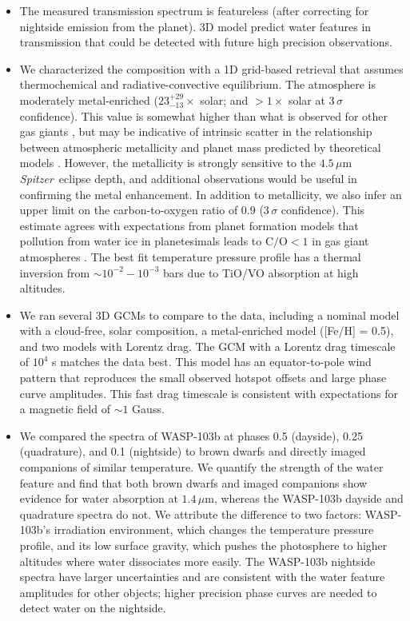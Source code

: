 \documentclass[twocolumn, trackchanges]{aastex61}
\newcommand{\project}[1]{\textsl{#1}}
\newcommand{\Spitzer}{\project{Spitzer}}
\begin{document}
\begin{itemize}
\item{The measured transmission spectrum is featureless (after correcting for nightside emission from the planet). 3D model predict water features in transmission that could be detected with future high precision observations.}
	\item{We characterized the composition with a 1D grid-based retrieval that assumes thermochemical and radiative-convective equilibrium. The atmosphere is moderately metal-enriched ($23^{+29}_{-13}\times$ solar; and $>1\times$ solar at $3\,\sigma$ confidence). This value is somewhat higher than what is observed for other gas giants \citep[e.g.][]{wong04, kreidberg14b}, but may be indicative of intrinsic scatter in the relationship between atmospheric metallicity and planet mass predicted by theoretical models \citep{fortney13, mordasini16}. However, the metallicity is strongly sensitive to the $4.5\,\mu$m \Spitzer\ eclipse depth, and additional observations would be useful in confirming the metal enhancement.  In addition to metallicity, we also infer an upper limit on the carbon-to-oxygen ratio of 0.9 ($3\,\sigma$ confidence). This estimate agrees with expectations from planet formation models that pollution from water ice in planetesimals leads to $\mathrm{C/O} < 1$ in gas giant atmospheres \citep{mordasini16, espinoza17}. The best fit temperature pressure profile has a thermal inversion from $\sim10^{-2} - 10^{-3}$ bars due to TiO/VO absorption at high altitudes.} 
	\item{We ran several 3D GCMs to compare to the data, including a nominal model with a cloud-free, solar composition, a metal-enriched model ([Fe/H] = 0.5), and two models with Lorentz drag. The GCM with a Lorentz drag timescale of $10^4$ s matches the data best. This model has an equator-to-pole wind pattern that reproduces the small observed hotspot offsets and large phase curve amplitudes. This fast drag timescale is consistent with expectations for a magnetic field of $\sim1$ Gauss.} 
	\item{We compared the spectra of WASP-103b at phases 0.5 (dayside), 0.25 (quadrature), and 0.1 (nightside) to brown dwarfs and directly imaged companions of similar temperature. We quantify the strength of the water feature and find that both brown dwarfs and imaged companions show evidence for water absorption at $1.4\,\mu$m, whereas the WASP-103b dayside and quadrature spectra do not. We attribute the difference to two factors: WASP-103b's irradiation environment, which changes the temperature pressure profile, and its low surface gravity, which pushes the photosphere to higher altitudes where water dissociates more easily. The WASP-103b nightside spectra have larger uncertainties and are consistent with the water feature amplitudes for other objects; higher precision phase curves are needed to detect water on the nightside.}
\end{itemize}
\end{document}
